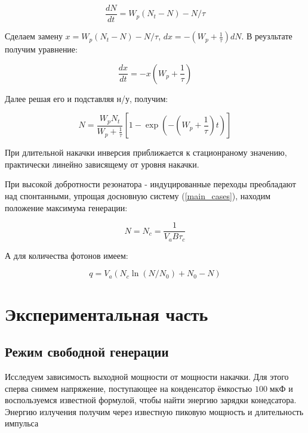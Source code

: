 \documentclass[a4paper]{article}
\begin{document}
\begin{equation}
	\frac{dN}{dt} = W_p (N_t-N) - N/\tau
\end{equation}

Сделаем замену $x = W_p (N_t - N) - N/\tau$, $dx = - (W_p + \frac{1}{\tau})dN$. В реузльтате получим уравнение:

\begin{equation}
	\frac{dx}{dt} = - x(W_p + \frac{1}{\tau})
\end{equation}

Далее решая его и подставляя н/у, получим:

\begin{equation}
	N = \frac{W_p N_t}{W_p + \frac{1}{\tau}}[1-\exp(-(W_p + \frac{1}{\tau})t)]
\end{equation}

При длительной накачки инверсия приближается к стационраному значению, практически линейно зависящему от уровня накачки.

При высокой добротности резонатора - индуцированные переходы преобладают над спонтанными, упрощая досновную систему (\ref{main_cases}), находим положение максимума генерации:

\begin{equation}
	N = N_c = \frac{1}{V_a B \tau_c}
\end{equation}

А для количества фотонов имеем:

\begin{equation}
	q = V_a(N_c \ln(N/N_0)+N_0 - N)
\end{equation}

\newpage



\section{Экспериментальная часть}
\subsection{Режим свободной генерации}

Исследуем зависимость выходной мощности от мощности накачки. Для этого сперва снимем напряжение, поступающее на конденсатор ёмкостью $100 \; \text{мкФ}$ и воспользуемся известной формулой, чтобы найти энергию зарядки конедсатора. Энергию излучения получим через известную пиковую мощность и длительность импульса
\end{document}
